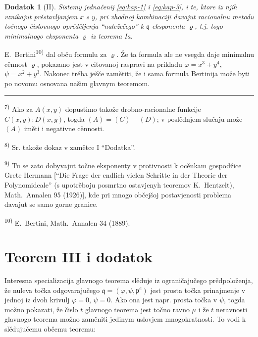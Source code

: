\documentclass[11pt]{article}
\newcommand{\foreign}[1]{#1}
\theoremstyle{plain}
\newtheorem{zusatz}{Dodatok}
\begin{document}
\begin{zusatz}[II]
Sistemy jednačenij \eqref{eq:kap-1} i \eqref{eq:kap-3}, i te, ktore
iz njih vznikajut prěstavljanjem $x$ s $y$, pri vhodnoj kombinaciji
davajut racionalnu metodu točnogo čislovnogo oprěděljenja
``naležečego'' k $\mathfrak{q}$ eksponenta
$\varrho$, t.j. togo minimalnogo eksponenta $\varrho$ iz teorema Ia.
\end{zusatz}

E.\ Bertini\textsuperscript{10)} dal obču formulu za $\varrho$.
Že ta formula ale ne vsegda daje minimalnu cěnnost $\varrho$,
pokazano jest v citovanoj raspravi na prikladu
$\varphi = x^{3} + y^{4}$, $\psi = x^{2} + y^{3}$. Nakonec trěba
ješče zamětiti, že i sama formula Bertinija može byti po novomu
osnovana našim glavnym teoremom.

\vspace{0.5em}
\noindent\rule{\textwidth}{0.4pt}
\vspace{0.3em}

{\footnotesize
\textsuperscript{7)} Ako za $A(x,y)$ dopustimo takože drobno-racionalne
funkcije $C(x,y):D(x,y)$, togda $(A) = (C) - (D)$; v poslědnjem
slučaju može $(A)$ iměti i negativne cěnnosti.

\textsuperscript{8)} Sr. takože dokaz v zamětce I ``Dodatka''.

\textsuperscript{9)} Tu se zato dobyvajut točne eksponenty v protivnosti k
ocěnkam gospodžice Grete Hermann [``\foreign{Die Frage der endlich vielen Schritte
in der Theorie der Polynomideale}'' (s upotrěboju posmrtno ostavjenyh
teoremov K.\ Hentzelt), \foreign{Math.\ Annalen} 95 (1926)], kde pri
mnogo občejšoj postavjenosti problema davajut se samo gorne granice.

\textsuperscript{10)} E.\ Bertini, \foreign{Math.\ Annalen} 34 (1889).
}

\newpage
\section*{Teorem III i dodatok}

Interesna specializacija glavnogo teorema slěduje iz ograničajučego
prědpoloženja, že nuleva točka odgovarajučego
$\mathfrak{q} = (\varphi, \psi, \mathfrak{p}^{e})$ jest prosta
točka prinajmenje v jednoj iz dvoh krivulj $\varphi = 0$, $\psi = 0$.
Ako ona jest napr. prosta točka v $\psi$, togda možno pokazati, že
čislo $t$ glavnogo teorema jest točno ravno $\mu$ i že $t$
neravnosti glavnogo teorema možno zaměniti jedinym uslovjem
mnogokratnosti. To vodi k slědujučemu občemu teoremu:
\end{document}
